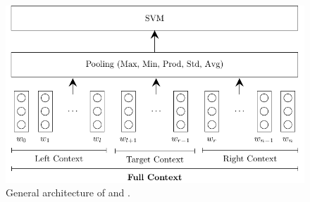 \begin{figure}[!h]
    \includegraphics{Diagrams/Reproducibility/vo_method.pdf}
    \caption{General architecture of \citet{vo2015target} and \citet{wang-etal-2017-tdparse}.}
    \label{fig:repro_np_architecture}
\end{figure}
\newpage


